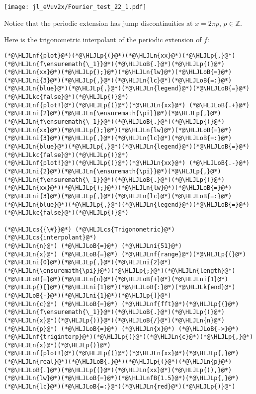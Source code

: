 \documentclass[12pt,a4paper]{article}
\newcommand{\HLJLk}[1]{\textcolor[RGB]{148,91,176}{\textbf{#1}}}
\newcommand{\HLJLkc}[1]{\textcolor[RGB]{59,151,46}{\textit{#1}}}
\newcommand{\HLJLn}[1]{#1}
\newcommand{\HLJLnf}[1]{\textcolor[RGB]{66,102,213}{#1}}
\newcommand{\HLJLnfB}[1]{\textcolor[RGB]{59,151,46}{#1}}
\newcommand{\HLJLni}[1]{\textcolor[RGB]{59,151,46}{#1}}
\newcommand{\HLJLoB}[1]{\textcolor[RGB]{102,102,102}{\textbf{#1}}}
\newcommand{\HLJLp}[1]{#1}
\newcommand{\HLJLcs}[1]{\textcolor[RGB]{153,153,119}{\textit{#1}}}
\begin{document}
\texttt{[image: jl\_eVuv2x/Fourier\_test\_22\_1.pdf]}

Notice that the periodic extension has jump discontinuities at $x = 2\pi p$, $p \in \mathbb{Z}$.

Here is the trigonometric interpolant of the periodic extension of $f$:


\begin{lstlisting}
(*@\HLJLnf{plot}@*)(*@\HLJLp{(}@*)(*@\HLJLn{xx}@*)(*@\HLJLp{,}@*)(*@\HLJLn{f\ensuremath{\_1}}@*)(*@\HLJLoB{.}@*)(*@\HLJLp{(}@*)(*@\HLJLn{xx}@*)(*@\HLJLp{);}@*)(*@\HLJLn{lw}@*)(*@\HLJLoB{=}@*)(*@\HLJLni{3}@*)(*@\HLJLp{,}@*)(*@\HLJLn{lc}@*)(*@\HLJLoB{=:}@*)(*@\HLJLn{blue}@*)(*@\HLJLp{,}@*)(*@\HLJLn{legend}@*)(*@\HLJLoB{=}@*)(*@\HLJLkc{false}@*)(*@\HLJLp{)}@*)
(*@\HLJLnf{plot!}@*)(*@\HLJLp{(}@*)(*@\HLJLn{xx}@*) (*@\HLJLoB{.+}@*) (*@\HLJLni{2}@*)(*@\HLJLn{\ensuremath{\pi}}@*)(*@\HLJLp{,}@*)(*@\HLJLn{f\ensuremath{\_1}}@*)(*@\HLJLoB{.}@*)(*@\HLJLp{(}@*)(*@\HLJLn{xx}@*)(*@\HLJLp{);}@*)(*@\HLJLn{lw}@*)(*@\HLJLoB{=}@*)(*@\HLJLni{3}@*)(*@\HLJLp{,}@*)(*@\HLJLn{lc}@*)(*@\HLJLoB{=:}@*)(*@\HLJLn{blue}@*)(*@\HLJLp{,}@*)(*@\HLJLn{legend}@*)(*@\HLJLoB{=}@*)(*@\HLJLkc{false}@*)(*@\HLJLp{)}@*)
(*@\HLJLnf{plot!}@*)(*@\HLJLp{(}@*)(*@\HLJLn{xx}@*) (*@\HLJLoB{.-}@*) (*@\HLJLni{2}@*)(*@\HLJLn{\ensuremath{\pi}}@*)(*@\HLJLp{,}@*)(*@\HLJLn{f\ensuremath{\_1}}@*)(*@\HLJLoB{.}@*)(*@\HLJLp{(}@*)(*@\HLJLn{xx}@*)(*@\HLJLp{);}@*)(*@\HLJLn{lw}@*)(*@\HLJLoB{=}@*)(*@\HLJLni{3}@*)(*@\HLJLp{,}@*)(*@\HLJLn{lc}@*)(*@\HLJLoB{=:}@*)(*@\HLJLn{blue}@*)(*@\HLJLp{,}@*)(*@\HLJLn{legend}@*)(*@\HLJLoB{=}@*)(*@\HLJLkc{false}@*)(*@\HLJLp{)}@*)

(*@\HLJLcs{{\#}}@*) (*@\HLJLcs{Trigonometric}@*) (*@\HLJLcs{interpolant}@*)
(*@\HLJLn{n}@*) (*@\HLJLoB{=}@*) (*@\HLJLni{51}@*)
(*@\HLJLn{x}@*) (*@\HLJLoB{=}@*) (*@\HLJLnf{range}@*)(*@\HLJLp{(}@*)(*@\HLJLni{0}@*)(*@\HLJLp{,}@*)(*@\HLJLni{2}@*)(*@\HLJLn{\ensuremath{\pi}}@*)(*@\HLJLp{;}@*)(*@\HLJLn{length}@*)(*@\HLJLoB{=}@*)(*@\HLJLn{n}@*)(*@\HLJLoB{+}@*)(*@\HLJLni{1}@*)(*@\HLJLp{)[}@*)(*@\HLJLni{1}@*)(*@\HLJLoB{:}@*)(*@\HLJLk{end}@*)(*@\HLJLoB{-}@*)(*@\HLJLni{1}@*)(*@\HLJLp{]}@*)
(*@\HLJLn{c}@*) (*@\HLJLoB{=}@*) (*@\HLJLnf{fft}@*)(*@\HLJLp{(}@*)(*@\HLJLn{f\ensuremath{\_1}}@*)(*@\HLJLoB{.}@*)(*@\HLJLp{(}@*)(*@\HLJLn{x}@*)(*@\HLJLp{))}@*)(*@\HLJLoB{/}@*)(*@\HLJLn{n}@*)
(*@\HLJLn{p}@*) (*@\HLJLoB{=}@*) (*@\HLJLn{x}@*) (*@\HLJLoB{->}@*) (*@\HLJLnf{triginterp}@*)(*@\HLJLp{(}@*)(*@\HLJLn{c}@*)(*@\HLJLp{,}@*) (*@\HLJLn{x}@*)(*@\HLJLp{)}@*)
(*@\HLJLnf{plot!}@*)(*@\HLJLp{(}@*)(*@\HLJLn{xx}@*)(*@\HLJLp{,}@*)(*@\HLJLn{real}@*)(*@\HLJLoB{.}@*)(*@\HLJLp{(}@*)(*@\HLJLn{p}@*)(*@\HLJLoB{.}@*)(*@\HLJLp{(}@*)(*@\HLJLn{xx}@*)(*@\HLJLp{)),}@*)(*@\HLJLn{lw}@*)(*@\HLJLoB{=}@*)(*@\HLJLnfB{1.5}@*)(*@\HLJLp{,}@*)(*@\HLJLn{lc}@*)(*@\HLJLoB{=:}@*)(*@\HLJLn{red}@*)(*@\HLJLp{)}@*)
\end{lstlisting}
\end{document}
